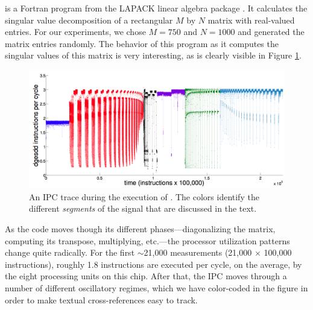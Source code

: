 \svd is a Fortran program from the LAPACK linear algebra package
\cite{lapack}.  It calculates the singular value decomposition of a
rectangular $M$ by $N$ matrix with real-valued entries.  For our
experiments, we chose $M=750$ and $N=1000$ and generated the matrix
entries randomly.
% 
% 
The behavior of this program as it computes the singular values of
this matrix is very interesting, as is clearly visible in Figure
\ref{fig:svd-ts-colored}.  
\begin{figure}[t]
    \centering
    \includegraphics[width=\columnwidth]{figs/SVD1RegimesColored}
    \caption{An IPC trace during the execution of \gcc.  The colors
      identify the different \emph{segments} of the signal that are
      discussed in the text.}
    \label{fig:svd-ts-colored}
  \end{figure}
As the code moves though its different phases---diagonalizing the
matrix, computing its transpose, multiplying, etc.---the processor
utilization patterns change quite radically.  For the first
$\sim$21,000 measurements (21,000 $\times$ 100,000 instructions),
roughly 1.8 instructions are executed per cycle, on the average, by
the eight processing units on this chip.  After that, the IPC moves
through a number of different oscillatory regimes, which we have
color-coded in the figure in order to make textual cross-references
easy to track.

